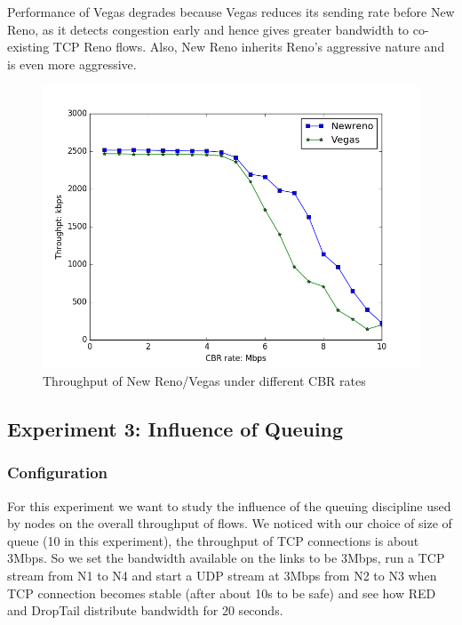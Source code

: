 \documentclass[10pt, conference]{IEEEtran/IEEEtran}
\begin{document}
Performance of Vegas degrades because Vegas reduces its sending rate before New Reno, as it detects congestion early and hence gives greater bandwidth to co-existing TCP Reno flows. Also, New Reno inherits Reno's aggressive nature and is even more aggressive.
\begin{figure}[!h]
\begin{center}
\includegraphics[width=\linewidth]{../exp2/exp2_Newreno_Vegas_thpt.png}
\caption{Throughput of New Reno/Vegas under different CBR rates}
\label{exp2_NewReno_Vegas_thpt}
\end{center}
\end{figure}




\subsection{Experiment 3: Influence of Queuing}

\subsubsection{Configuration}

For this experiment we want to study the influence of the queuing discipline used by nodes on the overall throughput of flows. We noticed with our choice of size of queue (10 in this experiment), the throughput of TCP connections is about 3Mbps. So we set the bandwidth available on the links to be 3Mbps, run a TCP stream from N1 to N4 and start a UDP stream at 3Mbps from N2 to N3 when TCP connection becomes stable (after about 10s to be safe) and see how RED and DropTail distribute bandwidth for 20 seconds.
\end{document}
